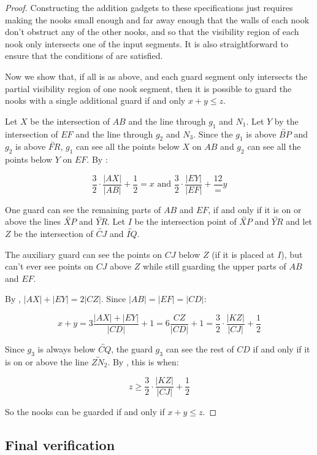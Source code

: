 \begin{proof}
Constructing the addition gadgets to these specifications just requires making the nooks small enough and far away enough that the walls of each nook don't obstruct any of the other nooks, and so that the visibility region of each nook only intersects one of the input segments. It is also straightforward to ensure that the conditions of  are satisfied.

Now we show that, if all is as above, and each guard segment only intersects the partial visibility region of one nook segment, then it is possible to guard the nooks with a single additional guard if and only $x+y\le z$.

Let $X$ be the intersection of $AB$ and the line through $g_1$ and $N_1$. Let $Y$ by the intersection of $EF$ and the line through $g_2$ and $N_3$. Since the $g_1$ is above $\overleftrightarrow{BP}$ and $g_2$ is above $\overleftrightarrow{FR}$, $g_1$ can see all the points below $X$ on $AB$ and $g_2$ can see all the points below $Y$ on $EF$. By :

\[\frac32\cdot\frac{|AX|}{|AB|}+\frac12=x\text{ and }\frac32\cdot\frac{|EY|}{|EF|}+\frac{12}=y\]

One guard can see the remaining parts of $AB$ and $EF$, if and only if it is on or above the lines $\overleftrightarrow{XP}$ and $\overleftrightarrow{YR}$. Let $I$ be the intersection point of $\overleftrightarrow{XP}$ and $\overleftrightarrow{YR}$ and let $Z$ be the intersection of $\overleftrightarrow{CJ}$ and $\overleftrightarrow{IQ}$.

The auxiliary guard can see the points on $CJ$ below $Z$ (if it is placed at $I$), but can't ever see points on $CJ$ above $Z$ while still guarding the upper parts of $AB$ and $EF$.

By , $|AX|+|EY|=2|CZ|$. Since $|AB|=|EF|=|CD|$:

\[x+y=3\frac{|AX|+|EY|}{|CD|}+1=6\frac{CZ}{|CD|}+1=\frac{3}{2}\cdot\frac{|KZ|}{|CJ|}+\frac{1}{2}\]

Since $g_3$ is always below $\overleftrightarrow{CQ}$, the guard $g_3$ can see the rest of $CD$ if and only if it is on or above the line $\overleftrightarrow{ZN_2}$. By , this is when:

\[z\ge \frac{3}{2}\cdot\frac{|KZ|}{|CJ|}+\frac{1}{2}\]

So the nooks can be guarded if and only if $x+y\le z$. 
\end{proof}

\subsection{Final verification}

